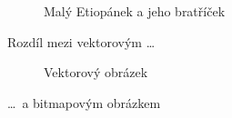 \documentclass[a4paper, 11pt]{article}
\begin{document}
\begin{figure}[h]
    \caption{Malý Etiopánek a jeho bratříček}\label{Obrazek1}
\end{figure}
\medskip
\pagebreak
Rozdíl mezi vektorovým \dots

\begin{figure}[h]
    \centering
    \caption{Vektorový obrázek}\label{Obrazek2}
\end{figure}
\bigskip
\noindent\dots~a bitmapovým obrázkem
\end{document}
